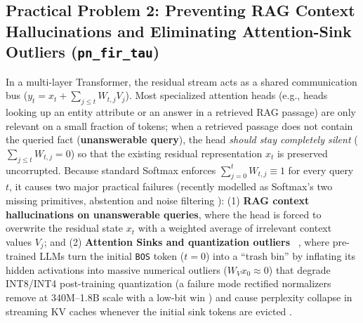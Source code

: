 \documentclass[11pt,a4paper]{article}
\begin{document}
\subsection{Practical Problem 2: Preventing RAG Context Hallucinations and Eliminating Attention-Sink Outliers (\texttt{pn\_fir\_tau})}

In a multi-layer Transformer, the residual stream acts as a shared communication bus ($y_t = x_t + \sum_{j \le t} W_{t,j} V_j$). Most specialized attention heads (e.g., heads looking up an entity attribute or an answer in a retrieved RAG passage) are only relevant on a small fraction of tokens; when a retrieved passage does not contain the queried fact (\textbf{unanswerable query}), the head \emph{should stay completely silent} ($\sum_{j \le t} W_{t,j} = 0$) so that the existing residual representation $x_t$ is preserved uncorrupted. Because standard Softmax enforces $\sum_{j=0}^{t} W_{t,j} \equiv 1$ for every query $t$, it causes two major practical failures (recently modelled as Softmax's two missing primitives, abstention and noise filtering \cite{wang2026abstention}): (1) \textbf{RAG context hallucinations on unanswerable queries}, where the head is forced to overwrite the residual state $x_t$ with a weighted average of irrelevant context values $V_j$; and (2) \textbf{Attention Sinks and quantization outliers} \cite{bondarenko2023quantizable}~\cite{xiao2024streamingllm}, where pre-trained LLMs turn the initial \texttt{BOS} token ($t=0$) into a ``trash bin'' by inflating its hidden activations into massive numerical outliers \cite{sun2024massive} ($W_V x_0 \approx 0$) that degrade INT8/INT4 post-training quantization \cite{bondarenko2023quantizable} (a failure mode rectified normalizers remove at 340M--1.8B scale with a low-bit win \cite{zuhri2025softpick}) and cause perplexity collapse in streaming KV caches whenever the initial sink tokens are evicted \cite{xiao2024streamingllm}.
\end{document}
